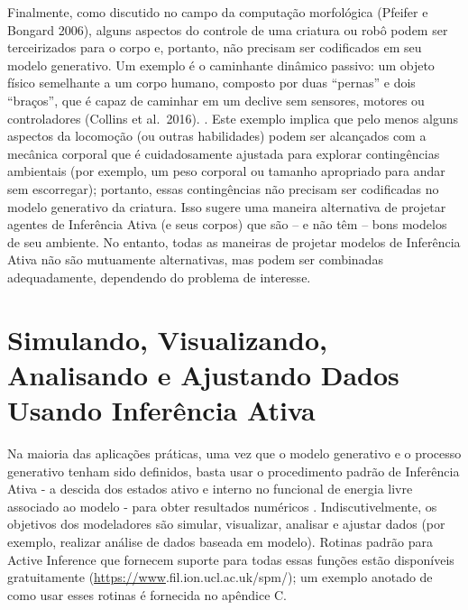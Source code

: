 \documentclass[
  12pt,
]{book}
\begin{document}
Finalmente, como discutido no campo da computação morfológica (Pfeifer e Bongard 2006), alguns aspectos do controle de uma criatura ou robô podem ser terceirizados para o corpo e, portanto, não precisam ser codificados em seu modelo generativo. Um exemplo é o caminhante dinâmico passivo: um objeto físico semelhante a um corpo humano, composto por duas ``pernas'' e dois ``braços'', que é capaz de caminhar em um declive sem sensores, motores ou controladores (Collins et al.~2016). . Este exemplo implica que pelo menos alguns aspectos da locomoção (ou outras habilidades) podem ser alcançados com a mecânica corporal que é cuidadosamente ajustada para explorar contingências ambientais (por exemplo, um peso corporal ou tamanho apropriado para andar sem escorregar); portanto, essas contingências não precisam ser codificadas no modelo generativo da criatura. Isso sugere uma maneira alternativa de projetar agentes de Inferência Ativa (e seus corpos) que são -- e não têm -- bons modelos de seu ambiente. No entanto, todas as maneiras de projetar modelos de Inferência Ativa não são mutuamente alternativas, mas podem ser combinadas adequadamente, dependendo do problema de interesse.

\hypertarget{simulando-visualizando-analisando-e-ajustando-dados-usando-inferuxeancia-ativa}{%
\section{Simulando, Visualizando, Analisando e Ajustando Dados Usando Inferência Ativa}\label{simulando-visualizando-analisando-e-ajustando-dados-usando-inferuxeancia-ativa}}

Na maioria das aplicações práticas, uma vez que o modelo generativo e o processo generativo tenham sido definidos, basta usar o procedimento padrão de Inferência Ativa - a descida dos estados ativo e interno no funcional de energia livre associado ao modelo - para obter resultados numéricos . Indiscutivelmente, os objetivos dos modeladores são simular, visualizar, analisar e ajustar dados (por exemplo, realizar análise de dados baseada em modelo). Rotinas padrão para Active Inference que fornecem suporte para todas essas funções estão disponíveis gratuitamente (\url{https://www}\hspace{0pt}.fil\hspace{0pt}.ion\hspace{0pt}.ucl\hspace{0pt}.ac\hspace{0pt}.uk\hspace{0pt}/spm\hspace{0pt}/); um exemplo anotado de como usar esses
rotinas é fornecida no apêndice C.
\end{document}
